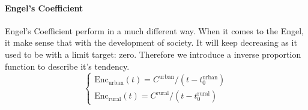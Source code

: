     \paragraph{Engel's Coefficient}
      Engel's Coefficient perform in a much different way. When it comes to the Engel, it make sense that with the development of society. It will keep decreasing as it used to be with a limit target: zero. Therefore we introduce a inverse proportion function to describe it's tendency.
    $$
    \begin{cases}
    \text{Enc}_\text{urban}(t) = C^\text{urban}/(t-t_0^\text{urban}) \\
    \text{Enc}_\text{rural}(t) = C^\text{rural}/(t-t_0^\text{rural})
    \end{cases}
    $$


    \begin{figure}[!h]
    \begin{center}
    \\

\end{center}
\end{figure}
